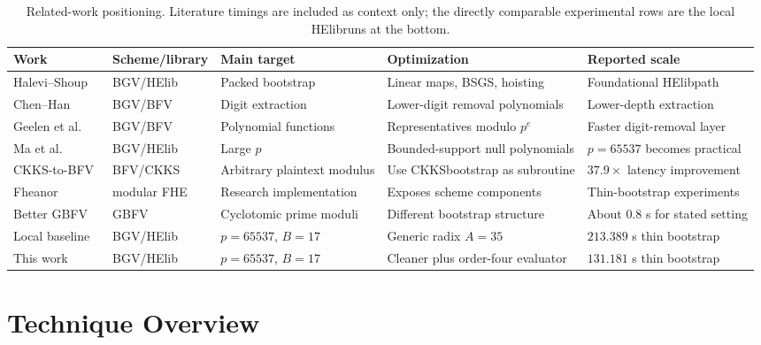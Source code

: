\documentclass[a4paper,runningheads]{llncs}
\newcommand{\HElib}{\textsf{HElib}}
\newcommand{\BGV}{\textsf{BGV}}
\newcommand{\BFV}{\textsf{BFV}}
\newcommand{\CKKS}{\textsf{CKKS}}
\newcommand{\GBFV}{\textsf{GBFV}}
\begin{document}
\begin{table}[t]
\centering
\caption{Related-work positioning.  Literature timings are included as
context only; the directly comparable experimental rows are the local
\HElib runs at the bottom.}
\label{tab:related_compare}
\scriptsize
\setlength{\tabcolsep}{3pt}
\begin{tabular}{p{2.7cm}p{1.9cm}p{2.2cm}p{2.8cm}p{2.3cm}}
\toprule
\textbf{Work} & \textbf{Scheme/library} & \textbf{Main target} &
\textbf{Optimization} & \textbf{Reported scale} \\
\midrule
Halevi--Shoup~\cite{halevi_shoup_helib_bootstrap,halevi_shoup_linear_transforms}
& \BGV/\HElib & Packed bootstrap & Linear maps, BSGS, hoisting
& Foundational \HElib path \\
Chen--Han~\cite{chen_han_lower_digits}
& \BGV/\BFV & Digit extraction & Lower-digit removal polynomials
& Lower-depth extraction \\
Geelen et al.~\cite{geelen_polyfunctions}
& \BGV/\BFV & Polynomial functions & Representatives modulo $p^e$
& Faster digit-removal layer \\
Ma et al.~\cite{ma_large_p}
& \BGV/\HElib & Large $p$ & Bounded-support null polynomials
& $p=65537$ becomes practical \\
\CKKS-to-\BFV~\cite{kim_bfv_from_ckks}
& \BFV/\CKKS & Arbitrary plaintext modulus & Use \CKKS bootstrap as subroutine
& $37.9\times$ latency improvement \\
Fheanor~\cite{fheanor}
& modular FHE & Research implementation & Exposes scheme components
& Thin-bootstrap experiments \\
Better \GBFV~\cite{better_gbfv}
& \GBFV & Cyclotomic prime moduli & Different bootstrap structure
& About $0.8$ s for stated setting \\
\midrule
Local baseline
& \BGV/\HElib & $p=65537$, $B=17$ & Generic radix $A=35$
& $213.389$ s thin bootstrap \\
This work
& \BGV/\HElib & $p=65537$, $B=17$ & Cleaner plus order-four evaluator
& $131.181$ s thin bootstrap \\
\bottomrule
\end{tabular}
\end{table}

\section{Technique Overview}
\label{sec:overview}
\end{document}
